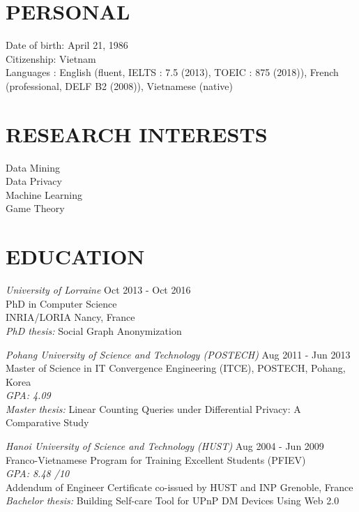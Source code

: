 \documentclass[margin, 10pt]{res} %
\begin{document}
\begin{resume}

 
%

\section{PERSONAL}
Date of birth: April 21, 1986 \\
Citizenship: Vietnam \\
Languages : English (fluent, IELTS : 7.5 (2013), TOEIC : 875 (2018)), French (professional, DELF B2 (2008)), Vietnamese (native)

\section{RESEARCH INTERESTS}
Data Mining \\
Data Privacy \\
Machine Learning \\
Game Theory

\section{EDUCATION}

{\sl University of Lorraine}  \hfill Oct 2013 - Oct 2016 \\
PhD in Computer Science \\
INRIA/LORIA Nancy, France \\
{\sl PhD thesis:} Social Graph Anonymization

% 
{\sl Pohang University of Science and Technology (POSTECH)}  \hfill Aug 2011 - Jun 2013 \\
Master of Science in IT Convergence Engineering (ITCE), POSTECH, Pohang, Korea \\
{\sl GPA: 4.09} \\
{\sl Master thesis:} Linear Counting Queries under Differential Privacy: A Comparative Study

%
{\sl Hanoi University of Science and Technology (HUST)}  \hfill Aug 2004 - Jun 2009 \\
Franco-Vietnamese Program for Training Excellent Students (PFIEV) \\
{\sl GPA: 8.48 /10} \\
Addendum of Engineer Certificate co-issued by HUST and INP Grenoble, France \\
{\sl Bachelor thesis:} Building Self-care Tool for UPnP DM Devices Using Web 2.0


\end{resume}
\end{document}

